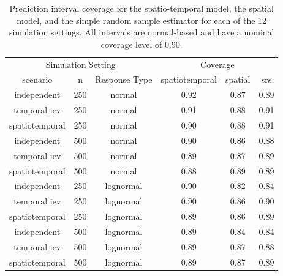 \documentclass[]{interact}
\theoremstyle{plain}%
\theoremstyle{definition}
\theoremstyle{remark}
\begin{document}
\begin{table}[H]

\caption{\label{tab:simpitab}Prediction interval coverage for the spatio-temporal model, the spatial model, and the simple random sample estimator for each of the 12 simulation settings. All intervals are normal-based and have a nominal coverage level of 0.90.}
\centering
\begin{tabular}[t]{cccccc}
\toprule
\multicolumn{3}{c}{Simulation Setting} & \multicolumn{3}{c}{Coverage} \\
\cmidrule(l{3pt}r{3pt}){1-3} \cmidrule(l{3pt}r{3pt}){4-6}
scenario & n & Response Type & spatiotemporal & spatial & srs\\
\midrule
independent & 250 & normal & 0.92 & 0.87 & 0.89\\
temporal iev & 250 & normal & 0.91 & 0.88 & 0.91\\
spatiotemporal & 250 & normal & 0.90 & 0.88 & 0.91\\
\midrule
independent & 500 & normal & 0.90 & 0.86 & 0.88\\
temporal iev & 500 & normal & 0.89 & 0.87 & 0.89\\
spatiotemporal & 500 & normal & 0.88 & 0.89 & 0.89\\
\midrule
independent & 250 & lognormal & 0.90 & 0.82 & 0.84\\
temporal iev & 250 & lognormal & 0.90 & 0.86 & 0.90\\
spatiotemporal & 250 & lognormal & 0.89 & 0.86 & 0.89\\
\midrule
independent & 500 & lognormal & 0.89 & 0.84 & 0.84\\
temporal iev & 500 & lognormal & 0.89 & 0.87 & 0.88\\
spatiotemporal & 500 & lognormal & 0.89 & 0.87 & 0.89\\
\bottomrule
\end{tabular}
\end{table}



\end{document}
